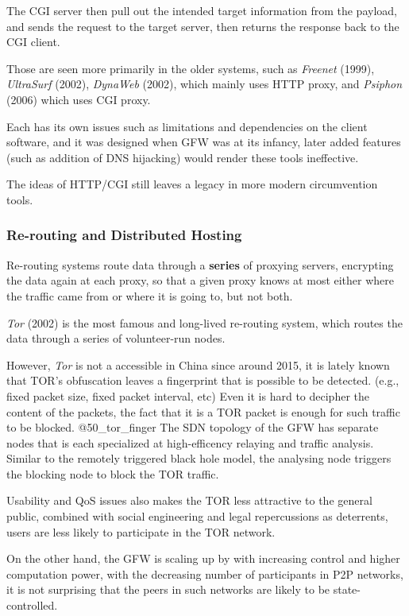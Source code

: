 The CGI server then pull out the intended target information from the
payload, and sends the request to the target server, then returns the
response back to the CGI client.

Those are seen more primarily in the older systems, such as
\emph{Freenet} (1999), \emph{UltraSurf} (2002), \emph{DynaWeb} (2002),
which mainly uses HTTP proxy, and \emph{Psiphon} (2006) which uses CGI
proxy.

Each has its own issues such as limitations and dependencies on the
client software, and it was designed when GFW was at its infancy, later
added features (such as addition of DNS hijacking) would render these
tools ineffective.

The ideas of HTTP/CGI still leaves a legacy in more modern circumvention
tools.

\hypertarget{re-routing-and-distributed-hosting}{%
\subsubsection{Re-routing and Distributed
Hosting}\label{re-routing-and-distributed-hosting}}

Re-routing systems route data through a \textbf{series} of proxying
servers, encrypting the data again at each proxy, so that a given proxy
knows at most either where the traffic came from or where it is going
to, but not both.

\emph{Tor} (2002) is the most famous and long-lived re-routing system,
which routes the data through a series of volunteer-run nodes.

However, \emph{Tor} is not a accessible in China since around 2015, it
is lately known that TOR's obfuscation leaves a fingerprint that is
possible to be detected. (e.g., fixed packet size, fixed packet
interval, etc) Even it is hard to decipher the content of the packets,
the fact that it is a TOR packet is enough for such traffic to be
blocked. @50\_tor\_finger The SDN topology of the GFW has separate nodes
that is each specialized at high-efficency relaying and traffic
analysis. Similar to the remotely triggered black hole model, the
analysing node triggers the blocking node to block the TOR traffic.

Usability and QoS issues also makes the TOR less attractive to the
general public, combined with social engineering and legal repercussions
as deterrents, users are less likely to participate in the TOR network.

On the other hand, the GFW is scaling up by with increasing control and
higher computation power, with the decreasing number of participants in
P2P networks, it is not surprising that the peers in such networks are
likely to be state-controlled.

